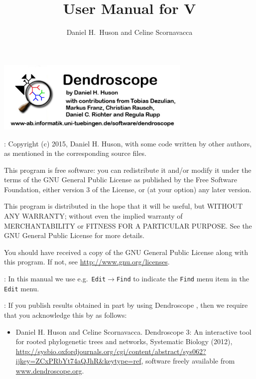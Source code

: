 \documentclass[11pt]{article}
\title{User Manual for \Dendroscope V\VERSION}
\author{Daniel H.~Huson and Celine Scornavacca}
\def\Dendroscope{{\sf Dendroscope }}
\begin{document}

\maketitle

\begin{center}
\includegraphics[width=0.7\textwidth]{./figs/about}
\end{center}

\tableofcontents



:
Copyright (c) 2015, Daniel H. Huson, with some code written by other authors, as mentioned in the corresponding source files.

This program is free software: you can redistribute it and/or modify
it under the terms of the GNU General Public License as published by
the Free Software Foundation, either version 3 of the License, or
(at your option) any later version.

This program is distributed in the hope that it will be useful,
but WITHOUT ANY WARRANTY; without even the implied warranty of
MERCHANTABILITY or FITNESS FOR A PARTICULAR PURPOSE.  See the
GNU General Public License for more details.

You should have received a copy of the GNU General Public License
along with this program.  If not, see \url{http://www.gnu.org/licenses}.

:
In this manual we use e.g.\ {\tt Edit}$\to${\tt Find} to indicate
the {\tt Find} menu item in the {\tt Edit} menu.

:
If you publish results obtained in part by using \Dendroscope, then we
require that you acknowledge this by  as follows:
\begin{itemize}
\item Daniel H. Huson and Celine Scornavacca. Dendroscope 3: An interactive tool for rooted phylogenetic trees and networks,
Systematic Biology (2012), \url{http://sysbio.oxfordjournals.org/cgi/content/abstract/sys062? ijkey=ZCxPRbYt74aQJhR&keytype=ref},
software freely available from
\href{http://www.dendroscope.org}{www.dendroscope.org}.
\end{itemize}
\end{document}
